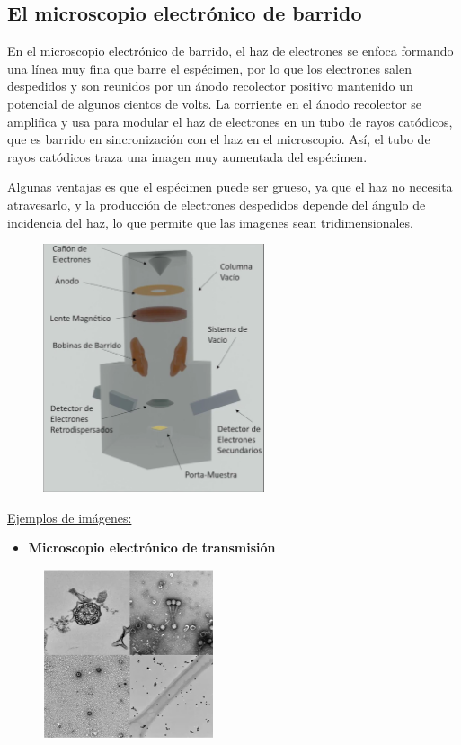 \documentclass[a4paper]{article}
\begin{document}
\subsection{El microscopio electrónico de barrido}

    \indent En el microscopio electrónico de barrido, el haz de electrones se enfoca formando una línea muy fina que barre el espécimen, por lo que los electrones salen despedidos y son reunidos por un ánodo recolector positivo mantenido un potencial de algunos cientos de volts. La corriente en el ánodo recolector se amplifica y usa para modular el haz de electrones en un tubo de rayos catódicos, que es barrido en sincronización con el haz en el microscopio. Así, el tubo de rayos catódicos traza una imagen muy aumentada del espécimen.\\

    \newpage
    \noindent
    \thispagestyle{fancy}

    \indent Algunas ventajas es que el espécimen puede ser grueso, ya que el haz no necesita atravesarlo, y la producción de electrones despedidos depende del ángulo de incidencia del haz, lo que permite que las imagenes sean tridimensionales.\\

    \begin{figure}[h!]
        \centering
        \includegraphics[width = 6.5cm]{../microbarrido.png}
    \end{figure}

\indent \underline{Ejemplos de imágenes:}

    \begin{itemize}
        \item \textbf{Microscopio electrónico de transmisión}
    \end{itemize}

    \begin{figure}[h!]
        \centering
        \includegraphics[width = 5cm]{../microtrans.png}
    \end{figure}
\end{document}
